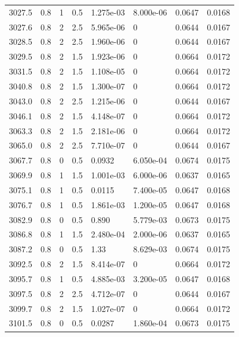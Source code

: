 \documentclass[preview]{standalone}
\begin{document}
{{{{{{{{{{\begin{tabular}{L{1.2cm}C{1.2cm} C{0.3cm}C{0.5cm} C{1.4cm}C{1.4cm} C{1.4cm}C{1.4cm}}
  3027.5  &   0.8  & 1     & 0.5 &  1.275e-03  & 8.000e-06  & 0.0647 &  0.0168   \\ 
  3027.6  &   0.8  & 2     & 2.5 &  5.965e-06  & 0  & 0.0644 &  0.0167   \\ 
  3028.5  &   0.8  & 2     & 2.5 &  1.960e-06  & 0  & 0.0644 &  0.0167   \\ 
  3029.5  &   0.8  & 2     & 1.5 &  1.923e-06  & 0  & 0.0664 &  0.0172   \\ 
  3031.5  &   0.8  & 2     & 1.5 &  1.108e-05  & 0  & 0.0664 &  0.0172   \\ 
  3040.8  &   0.8  & 2     & 1.5 &  1.300e-07  & 0  & 0.0664 &  0.0172   \\ 
  3043.0  &   0.8  & 2     & 2.5 &  1.215e-06  & 0  & 0.0644 &  0.0167   \\ 
  3046.1  &   0.8  & 2     & 1.5 &  4.148e-07  & 0  & 0.0664 &  0.0172   \\ 
  3063.3  &   0.8  & 2     & 1.5 &  2.181e-06  & 0  & 0.0664 &  0.0172   \\ 
  3065.0  &   0.8  & 2     & 2.5 &  7.710e-07  & 0  & 0.0644 &  0.0167   \\ 
  3067.7  &   0.8  & 0     & 0.5 &  0.0932  & 6.050e-04  & 0.0674 &  0.0175   \\ 
  3069.9  &   0.8  & 1     & 1.5 &  1.001e-03  & 6.000e-06  & 0.0637 &  0.0165   \\ 
  3075.1  &   0.8  & 1     & 0.5 &  0.0115  & 7.400e-05  & 0.0647 &  0.0168   \\ 
  3076.7  &   0.8  & 1     & 0.5 &  1.861e-03  & 1.200e-05  & 0.0647 &  0.0168   \\ 
  3082.9  &   0.8  & 0     & 0.5 &  0.890  & 5.779e-03  & 0.0673 &  0.0175   \\ 
  3086.8  &   0.8  & 1     & 1.5 &  2.480e-04  & 2.000e-06  & 0.0637 &  0.0165   \\ 
  3087.2  &   0.8  & 0     & 0.5 &  1.33  & 8.629e-03  & 0.0674 &  0.0175   \\ 
  3092.5  &   0.8  & 2     & 1.5 &  8.414e-07  & 0  & 0.0664 &  0.0172   \\ 
  3095.7  &   0.8  & 1     & 0.5 &  4.885e-03  & 3.200e-05  & 0.0647 &  0.0168   \\ 
  3097.5  &   0.8  & 2     & 2.5 &  4.712e-07  & 0  & 0.0644 &  0.0167   \\ 
  3099.7  &   0.8  & 2     & 1.5 &  1.027e-07  & 0  & 0.0664 &  0.0172   \\ 
  3101.5  &   0.8  & 0     & 0.5 &  0.0287  & 1.860e-04  & 0.0673 &  0.0175   \\ 

\end{tabular}}}}}}}}}}}
\end{document}
